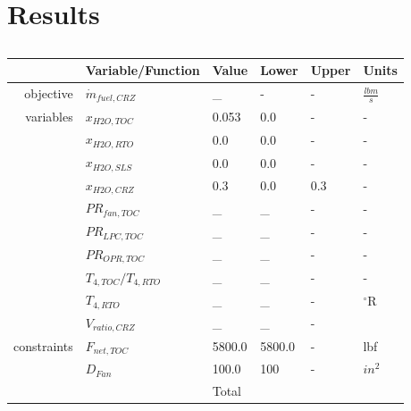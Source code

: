 \documentclass[conf]{new-aiaa}
\begin{document}
\section{Results}
\label{sec:results}

\begin{table}[h]
  \centering
  \caption{
  }
  \small
  \renewcommand{\arraystretch}{1.2}
  \begin{tabular}{r l l l l l}
                & Variable/Function     & Value  & Lower  & Upper & Units           \\
    \toprule
    objective   & $\dot{m}_{fuel,CRZ}$  & _      & -      & -     & $\frac{lbm}{s}$ \\
    \hline
    variables   & $x_{H2O,TOC}$         & 0.053  & 0.0    & -     & -               \\
                & $x_{H2O,RTO}$         & 0.0    & 0.0    & -     & -               \\
                & $x_{H2O,SLS}$         & 0.0    & 0.0    & -     & -               \\
                & $x_{H2O,CRZ}$         & 0.3    & 0.0    & 0.3   & -               \\
                & $PR_{fan,TOC}$        & _      & _      & -     & -               \\
                & $PR_{LPC,TOC}$        & _      & _      & -     & -               \\
                & $PR_{OPR,TOC}$        & _      & _      & -     & -               \\
                & $T_{4,TOC}/T_{4,RTO}$ & _      & _      & -     & -               \\
                & $T_{4,RTO}$           & _      & _      & -     & $^\circ$R       \\
                & $V_{ratio,CRZ}$       & _      & _      & -     &                 \\
    \cline{3-5}
    constraints & $F_{net,TOC}$         & 5800.0 & 5800.0 & -     & lbf             \\
                & $D_{Fan}$             & 100.0  & 100    & -     & $in^2$          \\
    \cline{3-5}
                &                       & Total  &                                  \\
    \bottomrule
  \end{tabular}
  \label{tab:opt_res_JetA}
\end{table}
\end{document}

